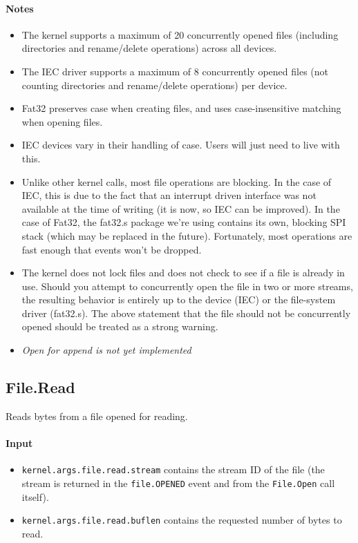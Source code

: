 \paragraph{Notes}
\begin{itemize}
\item The kernel supports a maximum of 20 concurrently opened files (including directories and rename/delete operations) across all devices.
\item The IEC driver supports a maximum of 8 concurrently opened files (not counting directories and rename/delete operations) per device. 
\item Fat32 preserves case when creating files, and uses case-insensitive matching when opening files.
\item IEC devices vary in their handling of case.  Users will just need to live with this.
\item Unlike other kernel calls, most file operations are blocking.  In the case of IEC, this is due to the fact that an interrupt driven interface was not available at the time of writing (it is now, so IEC can be improved).  In the case of Fat32, the fat32.s package we're using contains its own, blocking SPI stack (which may be replaced in the future).  Fortunately, most operations are fast enough that events won't be dropped.
\item The kernel does not lock files and does not check to see if a file is already in use.  Should you attempt to concurrently open the file in two or more streams, the resulting behavior is entirely up to the device (IEC) or the file-system driver (fat32.s).  The above statement that the file should not be concurrently opened should be treated as a strong warning. 
\item {\em Open for append is not yet implemented}
\end{itemize}


\subsection*{File.Read}
Reads bytes from a file opened for reading.

\paragraph{Input}
\begin{itemize}
\item \verb+kernel.args.file.read.stream+ contains the stream ID of the file (the stream is returned in the \verb+file.OPENED+ event and from the \verb+File.Open+ call itself).
\item \verb+kernel.args.file.read.buflen+ contains the requested number of bytes to read.
\end{itemize}

